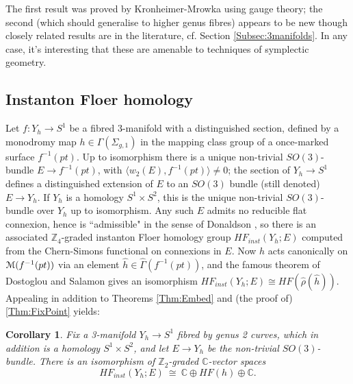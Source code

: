 \documentclass[reqno,10pt]{amsart}
\numberwithin{equation}{section}
\newcommand{\bC}{{\mathbb C}}
\newcommand{\bZ}{{\mathbb Z}}
\newcommand{\scrM}{\EuScript{M}}
\newtheorem{Corollary}[thm]{Corollary}
\theoremstyle{remark}
\begin{document}
The first result was proved by Kronheimer-Mrowka \cite{KM2} using gauge theory; the second (which should generalise to higher genus fibres) appears to be new though closely related results are in the literature, cf. Section \ref{Subsec:3manifolds}. In any case, it's interesting that these are amenable to techniques of symplectic geometry. 




\subsection{Instanton Floer homology}\label{Sec:InstFloer}


 Let $f: Y_h \rightarrow S^1$ be a fibred 3-manifold with a distinguished section, defined by a monodromy map $h \in \Gamma(\Sigma_{g,1})$ in the mapping class group of a once-marked surface $f^{-1}(pt)$.  Up to isomorphism there is a unique non-trivial $SO(3)$-bundle $E\rightarrow f^{-1}(pt)$, with $\langle w_2(E),  f^{-1}(pt)\rangle \neq 0$; the section of $Y_h \rightarrow S^1$ defines a distinguished extension of $E$ to an $SO(3)$ bundle (still denoted) $E\rightarrow Y_h$.  If $Y_h$ is a homology $S^1 \times S^2$, this is the unique non-trivial $SO(3)$-bundle over $Y_h$ up to isomorphism.  Any such $E$  admits no reducible flat connexion, hence is ``admissible" in the sense of Donaldson \cite{Donaldson:Floer}, so there is an associated $\bZ_4$-graded instanton Floer homology group  $HF_{inst}(Y_h; E)$ computed from the Chern-Simons functional on connexions in $E$. Now $h$  acts canonically on $\scrM(f^{-1}(pt))$ via an element $\hat{h} \in \widehat{\Gamma}(f^{-1}(pt))$, and the famous theorem of Dostoglou and Salamon \cite{DS} gives an isomorphism $HF_{inst}(Y_h; E) \cong HF(\hat{\rho}(\hat{h}))$.   Appealing in addition to Theorems \ref{Thm:Embed} and (the proof of) \ref{Thm:FixPoint} yields:

\begin{Corollary} \label{Cor:AllSummands}
Fix a  3-manifold $Y_{h} \rightarrow S^1$ fibred by genus 2 curves, which in addition is a homology $S^1 \times S^2$, and let $E \rightarrow Y_h$ be the non-trivial $SO(3)$-bundle.  There is an isomorphism of $\bZ_2$-graded $\bC$-vector spaces
\begin{equation} \label{Equation:HFinstanton}
HF_{inst}(Y_{h}; E) \ \cong \ \bC \oplus HF(h) \oplus \bC.
\end{equation}
\end{Corollary}
\end{document}
